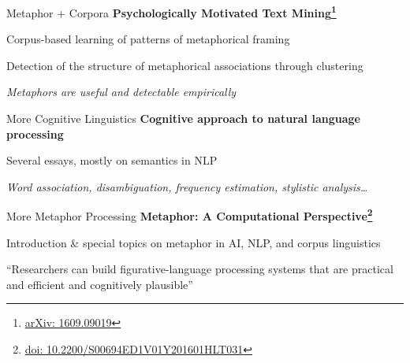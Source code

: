 \documentclass[aspectratio=169,cramped]{beamer}
\let\tempone\itemize
\let\temptwo\enditemize
\renewenvironment{itemize}{\tempone\addtolength{\itemsep}{-0\baselineskip}\addtolength{\parskip}{-0.2\baselineskip}}{\temptwo}
\newcommand*{\doi}[1]{\href{http://doai.io/#1}{doi: #1}}
\begin{document}
\begin{frame}{Metaphor + Corpora}
	\textbf{Psychologically Motivated Text Mining\footnote{\protect\href{http://arxiv.org/abs/1609.09019}{arXiv: 1609.09019}}}
  \begin{itemize}
  \item Corpus-based learning of patterns of metaphorical framing
  \item Detection of the structure of metaphorical associations through clustering
  \item \textit{Metaphors are useful and detectable empirically}
  \end{itemize}
\end{frame}

\begin{frame}{More Cognitive Linguistics}
	\textbf{Cognitive approach to natural language processing}
  \begin{itemize}
  \item Several essays, mostly on semantics in NLP
  \item \textit{Word association, disambiguation, frequency estimation, stylistic analysis\ldots}
  \end{itemize}
\end{frame}

\begin{frame}{More Metaphor Processing}
	\textbf{Metaphor: A Computational Perspective\footnote{\doi{10.2200/S00694ED1V01Y201601HLT031}}}
  \begin{itemize}
  \item Introduction \& special topics on metaphor in AI, NLP, and corpus linguistics
  \item ``Researchers can build figurative-language processing systems that are practical
    and efficient and cognitively plausible''
  \end{itemize}
\end{frame}

\end{document}
